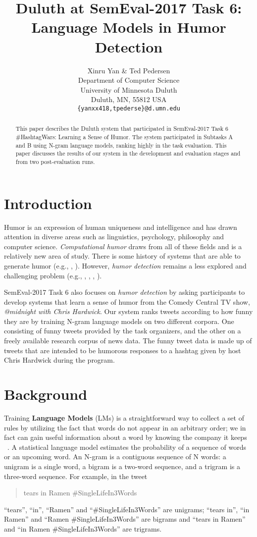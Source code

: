 \documentclass[11pt,a4paper]{article}
\title{Duluth at SemEval-2017 Task 6:  Language Models in Humor Detection}
\author{Xinru Yan \& Ted Pedersen\\
  Department of Computer Science \\ University of Minnesota Duluth \\ Duluth, MN, 55812 USA \\
  {\tt \{yanxx418,tpederse\}@d.umn.edu}}
\date{}
\begin{document}
\maketitle
\begin{abstract}
This paper describes the Duluth system that participated in 
SemEval-2017 Task 6 \#HashtagWars: 
Learning a Sense of Humor. The system participated in 
Subtasks A and B using N-gram 
language models, ranking highly in the task evaluation. 
This paper discusses the results of 
our system in the development and evaluation stages 
and from two post-evaluation runs. 
\end{abstract}

\section{Introduction}
Humor is an expression of  human uniqueness and intelligence and has drawn 
attention in diverse areas such as linguistics, psychology, philosophy and 
computer science. \textit{Computational humor} draws from all of these 
fields and is a relatively new area of study. 
There is some history of systems that are able to generate 
humor (e.g., \cite{StockS03}, \cite{ozbal2012computational}). 
However, \textit{humor detection} remains a less explored 
and challenging problem (e.g., \cite{Learning:To:Laugh}, 
\cite{Recognizing:Humor:On:Twitter}, \cite{ShahafHM15}, \cite{MillerG15}). 

SemEval-2017 Task 6 \cite{PotashRR17} 
also focuses on \textit{humor detection} by asking participants to 
develop systems that 
learn a sense of humor from the Comedy Central TV show, 
\textit{@midnight with Chris Hardwick}. Our system 
ranks tweets according to how funny they are
by training N-gram language models 
on two different corpora. One consisting of funny tweets 
provided by the task organizers, and 
the other on a freely available research corpus of news data. 
The funny tweet data is made up of tweets that are intended to
be humorous responses to a hashtag given by host Chris Hardwick
during the program. 

\section{Background}

Training \textbf{Language Models} (LMs) is a straightforward 
way to collect a set of rules by 
utilizing the fact that words do not appear in an arbitrary order; 
we in fact can gain useful information about a word by knowing 
the company it keeps ~\cite{Firth57}. A statistical language 
model estimates the probability of a sequence of words or an upcoming 
word. 
An N-gram is a contiguous sequence of N words: a unigram is a 
single word, a bigram is a two-word sequence, 
and a trigram is a three-word sequence. For example, in the tweet 
\begin{quote}
tears in Ramen \#SingleLifeIn3Words
\end{quote}
``tears'', ``in'', ``Ramen'' and ``\#SingleLifeIn3Words'' are unigrams; ``tears in'', 
``in Ramen'' and ``Ramen \#SingleLifeIn3Words'' 
are bigrams and ``tears in Ramen'' and ``in Ramen 
\#SingleLifeIn3Words'' are trigrams.
\end{document}
